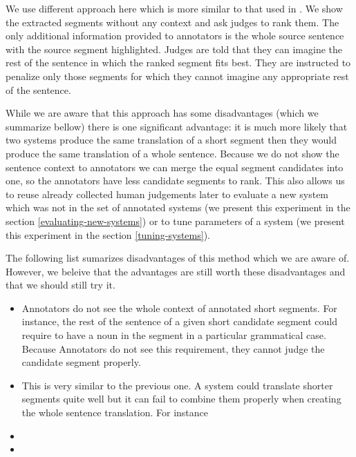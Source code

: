 We use different approach here which is more similar to that used in
. We show the extracted segments without any context
and ask judges to rank them. The only additional information provided to
annotators is the whole source sentence with the source segment highlighted.
Judges are told that they can imagine the rest of the sentence in which the
ranked segment fits best. They are instructed to penalize only those segments
for which they cannot imagine any appropriate rest of the sentence.

While we are aware that this approach has some disadvantages (which we
summarize bellow) there is one significant advantage: it is much more likely
that two systems produce the same translation of a short segment then they
would produce the same translation of a whole sentence. Because we do not show
the sentence context to annotators we can merge the equal segment candidates
into one, so the annotators have less candidate segments to rank. This also
allows us to reuse already collected human judgements later to evaluate a new
system which was not in the set of annotated systems (we present this
experiment in the section \ref{evaluating-new-systems}) or to tune parameters
of a system (we present this experiment in the section \ref{tuning-systems}).

The following list sumarizes disadvantages of this method which we are aware
of. However, we beleive that the advantages are still worth these
disadvantages and that we should still try it.

\begin{itemize}

  \item Annotators do not see the whole context of annotated short segments.
    For instance, the rest of the sentence of a given short candidate segment
    could require to have a noun in the segment in a particular grammatical
    case. Because Annotators do not see this requirement, they cannot judge
    the candidate segment properly.

  \item This is very similar to the previous one. A system could translate
    shorter segments quite well but it can fail to combine them properly when
    creating the whole sentence translation. For instance 

  \item {}
  \item {}
\end{itemize}

